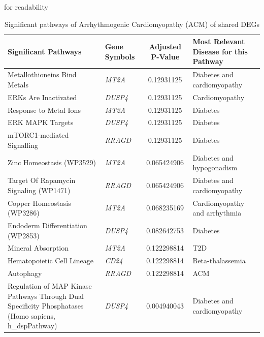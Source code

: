 \begin{table}[H]
\centering
\caption{Significant pathways of Arrhythmogenic Cardiomyopathy (ACM) of shared DEGs}
\label{tab:ACM_pathways}
\small\renewcommand{\arraystretch}{1.2} %
for readability
\begin{tabularx}{\textwidth}{|X|X|c|X|}
\hline
\textbf{Significant Pathways} & \textbf{Gene Symbols} & \textbf{Adjusted P-Value} & \textbf{Most Relevant Disease for this Pathway} \\
\hline
Metallothioneins Bind Metals & \textit{MT2A} & 0.12931125 & Diabetes and cardiomyopathy \\
\hline
ERKs Are Inactivated & \textit{DUSP4} & 0.12931125 & Cardiomyopathy \\
\hline
Response to Metal Ions & \textit{MT2A} & 0.12931125 & Diabetes \\
\hline
ERK MAPK Targets & \textit{DUSP4} & 0.12931125 & Diabetes \\
\hline
mTORC1-mediated Signalling & \textit{RRAGD} & 0.12931125 & Diabetes \\
\hline
Zinc Homeostasis (WP3529) & \textit{MT2A} & 0.065424906 & Diabetes and hypogonadism \\
\hline
Target Of Rapamycin Signaling (WP1471) & \textit{RRAGD} & 0.065424906 & Diabetes and cardiomyopathy \\
\hline
Copper Homeostasis (WP3286) & \textit{MT2A} & 0.068235169 & Cardiomyopathy and arrhythmia \\
\hline
Endoderm Differentiation (WP2853) & \textit{DUSP4} & 0.082642753 & Diabetes \\
\hline
Mineral Absorption & \textit{MT2A} & 0.122298814 & T2D \\
\hline
Hematopoietic Cell Lineage & \textit{CD24} & 0.122298814 & Beta-thalassemia \\
\hline
Autophagy & \textit{RRAGD} & 0.122298814 & ACM \\
\hline
Regulation of MAP Kinase Pathways Through Dual Specificity Phosphatases (Homo sapiens, h\_dspPathway) & \textit{DUSP4} & 0.004940043 & Diabetes and cardiomyopathy \\
\hline
\end{tabularx}
\end{table}


